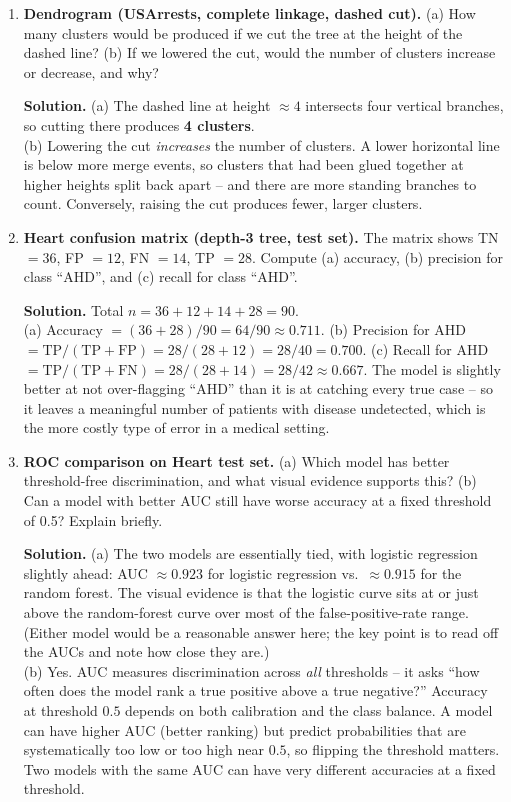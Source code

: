 \documentclass[11pt]{article}
\newcommand{\solution}[1]{%
  \par\medskip\noindent\textbf{Solution.} #1\par\medskip
}
\begin{document}
\begin{enumerate}[leftmargin=*]
\item \textbf{Dendrogram (USArrests, complete linkage, dashed cut).} (a) How many clusters would be produced if we cut the tree at the height of the dashed line? (b) If we lowered the cut, would the number of clusters increase or decrease, and why?

\solution{(a) The dashed line at height $\approx 4$ intersects four vertical branches, so cutting there produces \textbf{4 clusters}.\\
(b) Lowering the cut \emph{increases} the number of clusters. A lower horizontal line is below more merge events, so clusters that had been glued together at higher heights split back apart -- and there are more standing branches to count. Conversely, raising the cut produces fewer, larger clusters.}

\item \textbf{Heart confusion matrix (depth-3 tree, test set).} The matrix shows TN $= 36$, FP $= 12$, FN $= 14$, TP $= 28$. Compute (a) accuracy, (b) precision for class ``AHD'', and (c) recall for class ``AHD''.

\solution{Total $n = 36 + 12 + 14 + 28 = 90$.\\
(a) Accuracy $= (36 + 28)/90 = 64/90 \approx \mathbf{0.711}$. \;
(b) Precision for AHD $= \text{TP}/(\text{TP}+\text{FP}) = 28/(28+12) = 28/40 = \mathbf{0.700}$. \;
(c) Recall for AHD $= \text{TP}/(\text{TP}+\text{FN}) = 28/(28+14) = 28/42 \approx \mathbf{0.667}$. \;
The model is slightly better at not over-flagging ``AHD'' than it is at catching every true case -- so it leaves a meaningful number of patients with disease undetected, which is the more costly type of error in a medical setting.}

\item \textbf{ROC comparison on Heart test set.} (a) Which model has better threshold-free discrimination, and what visual evidence supports this? (b) Can a model with better AUC still have worse accuracy at a fixed threshold of 0.5? Explain briefly.

\solution{(a) The two models are essentially tied, with logistic regression slightly ahead: AUC $\approx 0.923$ for logistic regression vs.~$\approx 0.915$ for the random forest. The visual evidence is that the logistic curve sits at or just above the random-forest curve over most of the false-positive-rate range. (Either model would be a reasonable answer here; the key point is to read off the AUCs and note how close they are.)\\
(b) Yes. AUC measures discrimination across \emph{all} thresholds -- it asks ``how often does the model rank a true positive above a true negative?'' Accuracy at threshold $0.5$ depends on both calibration and the class balance. A model can have higher AUC (better ranking) but predict probabilities that are systematically too low or too high near $0.5$, so flipping the threshold matters. Two models with the same AUC can have very different accuracies at a fixed threshold.}


\end{enumerate}
\end{document}
